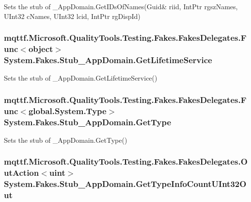 Sets the stub of \-\_\-\-App\-Domain.\-Get\-I\-Ds\-Of\-Names(Guid\& riid, Int\-Ptr rgsz\-Names, U\-Int32 c\-Names, U\-Int32 lcid, Int\-Ptr rg\-Disp\-Id)

\hypertarget{class_system_1_1_fakes_1_1_stub___app_domain_a4ffb869bfc6c60896d21e73ddd416936}{
\subsubsection[{Get\-Lifetime\-Service}]{\setlength{\rightskip}{0pt plus 5cm}mqttf.\-Microsoft.\-Quality\-Tools.\-Testing.\-Fakes.\-Fakes\-Delegates.\-Func$<$object$>$ System.\-Fakes.\-Stub\-\_\-\-App\-Domain.\-Get\-Lifetime\-Service}}\label{class_system_1_1_fakes_1_1_stub___app_domain_a4ffb869bfc6c60896d21e73ddd416936}


Sets the stub of \-\_\-\-App\-Domain.\-Get\-Lifetime\-Service()

\hypertarget{class_system_1_1_fakes_1_1_stub___app_domain_a2c18b95864378ff53e20922170568fb2}{
\subsubsection[{Get\-Type}]{\setlength{\rightskip}{0pt plus 5cm}mqttf.\-Microsoft.\-Quality\-Tools.\-Testing.\-Fakes.\-Fakes\-Delegates.\-Func$<$global.\-System.\-Type$>$ System.\-Fakes.\-Stub\-\_\-\-App\-Domain.\-Get\-Type}}\label{class_system_1_1_fakes_1_1_stub___app_domain_a2c18b95864378ff53e20922170568fb2}


Sets the stub of \-\_\-\-App\-Domain.\-Get\-Type()

\hypertarget{class_system_1_1_fakes_1_1_stub___app_domain_a7a95b74d9632d891e04bd3c6b1585815}{
\subsubsection[{Get\-Type\-Info\-Count\-U\-Int32\-Out}]{\setlength{\rightskip}{0pt plus 5cm}mqttf.\-Microsoft.\-Quality\-Tools.\-Testing.\-Fakes.\-Fakes\-Delegates.\-Out\-Action$<$uint$>$ System.\-Fakes.\-Stub\-\_\-\-App\-Domain.\-Get\-Type\-Info\-Count\-U\-Int32\-Out}}\label{class_system_1_1_fakes_1_1_stub___app_domain_a7a95b74d9632d891e04bd3c6b1585815}


